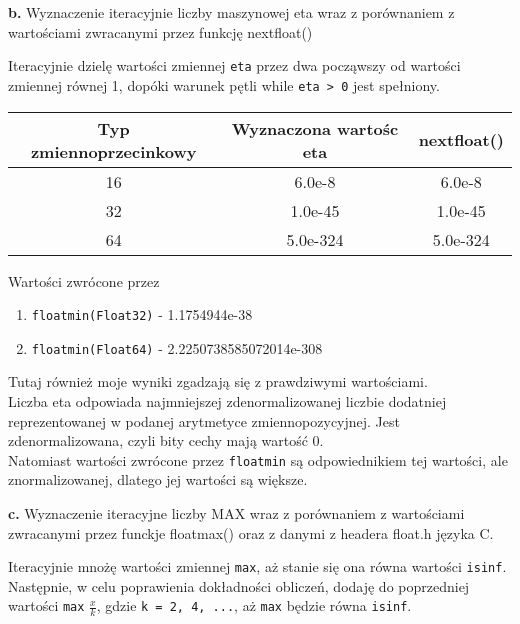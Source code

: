 \documentclass[15pt, a4paper]{article}
\begin{document}
\vspace{0.5cm}

\textbf{b. } Wyznaczenie iteracyjnie liczby maszynowej eta wraz z porównaniem z wartościami zwracanymi przez funkcję nextfloat()

\vspace{0.5cm}

Iteracyjnie dzielę wartości zmiennej \verb|eta| przez dwa począwszy od wartości zmiennej równej 1, dopóki warunek pętli while \verb|eta > 0| jest spełniony. 

\begin{table}[ht]
    \begin{tabular}{|c|c|c|}
        \hline 
        Typ zmiennoprzecinkowy & Wyznaczona wartośc eta & nextfloat() \\ \hline
        16 & 6.0e-8 & 6.0e-8 \\ \hline
        32 & 1.0e-45 & 1.0e-45 \\ \hline
        64 & 5.0e-324 & 5.0e-324 \\ \hline
    \end{tabular}
    \label{tab:eta}
\end{table}


Wartości zwrócone przez
\begin{enumerate}
    \item \verb|floatmin(Float32)| - 1.1754944e-38
    \item \verb|floatmin(Float64)| - 2.2250738585072014e-308
\end{enumerate}

Tutaj również moje wyniki zgadzają się z prawdziwymi wartościami. \\
Liczba eta odpowiada najmniejszej zdenormalizowanej liczbie dodatniej reprezentowanej w podanej arytmetyce zmiennopozycyjnej. Jest zdenormalizowana, czyli bity cechy mają wartość 0. \\
Natomiast wartości zwrócone przez \verb|floatmin| są odpowiednikiem tej wartości, ale znormalizowanej, dlatego jej wartości są większe.

\vspace{0.5cm}

\textbf{c. } Wyznaczenie iteracyjne liczby MAX wraz z porównaniem z wartościami zwracanymi przez funckje floatmax() oraz z danymi z headera float.h języka C.

\vspace{0.5cm}

Iteracyjnie mnożę wartości zmiennej \verb|max|, aż stanie się ona równa wartości \verb|isinf|. Następnie, w celu poprawienia dokładności obliczeń, dodaję do poprzedniej wartości \verb|max| $\frac{x}{k}$, gdzie \verb|k = 2, 4, ...|, aż \verb|max| będzie równa \verb|isinf|.
\end{document}
